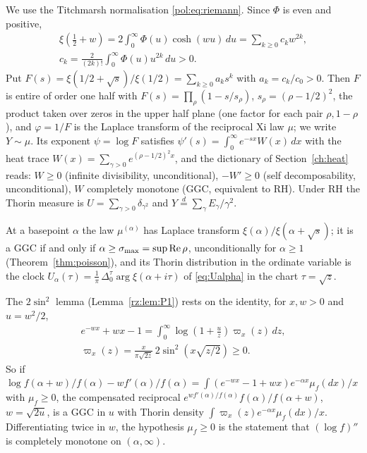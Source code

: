 We use the Titchmarsh normalisation \eqref{pol:eq:riemann}. Since $\Phi$ is even and positive,
\begin{equation}\label{pol:eq:F}
\begin{gathered}
\xi\!\left(\tfrac12+w\right)=2\int_0^\infty\Phi(u)\cosh(wu)\,du=\sum_{k\ge0}c_kw^{2k},\\[4pt] c_k=\frac{2}{(2k)!}\int_0^\infty\Phi(u)u^{2k}\,du>0 .
\end{gathered}
\end{equation}
Put $F(s)=\xi(1/2+\sqrt s)/\xi(1/2)=\sum_{k\ge0}a_ks^k$ with $a_k=c_k/c_0>0$. Then $F$ is entire of order one half with $F(s)=\prod_\rho(1-s/s_\rho)$, $s_\rho=(\rho-1/2)^2$, the product taken over zeros in the upper half plane (one factor for each pair $\rho,1-\rho$), and $\varphi=1/F$ is the Laplace transform of the reciprocal Xi law $\mu$; we write $Y\sim\mu$. Its exponent $\psi=\log F$ satisfies $\psi'(s)=\int_0^\infty e^{-sx}W(x)\,dx$ with the heat trace $W(x)=\sum_{\gamma>0}e^{(\rho-1/2)^2x}$, and the dictionary of Section~\ref{ch:heat} reads: $W\ge0$ (infinite divisibility, unconditional), $-W'\ge0$ (self decomposability, unconditional), $W$ completely monotone (GGC, equivalent to RH). Under RH the Thorin measure is $U=\sum_{\gamma>0}\delta_{\gamma^2}$ and $Y\stackrel{d}{=}\sum_\gamma E_\gamma/\gamma^2$.

At a basepoint $\alpha$ the law $\mu^{(\alpha)}$ has Laplace transform $\xi(\alpha)/\xi(\alpha+\sqrt s)$; it is a GGC if and only if $\alpha\ge\sigma_{\max}=\sup\operatorname{Re}\rho$, unconditionally for $\alpha\ge1$ (Theorem~\ref{thm:poisson}), and its Thorin distribution in the ordinate variable is the clock $U_\alpha(\tau)=\frac1\pi\,\Delta_0^\tau\arg\xi(\alpha+i\tau)$ of \eqref{eq:Ualpha} in the chart $\tau=\sqrt z$.

The $2\sin^2$ lemma (Lemma~\ref{rz:lem:P1}) rests on the identity, for $x,w>0$ and $u=w^2/2$,
\begin{equation}\label{pol:eq:lemma}
\begin{gathered}
e^{-wx}+wx-1=\int_0^\infty\log\!\left(1+\frac uz\right)\varpi_x(z)\,dz,\\[4pt] \varpi_x(z)=\frac{x}{\pi\sqrt{2z}}\,2\sin^2\!\left(x\sqrt{z/2}\right)\ge0 .
\end{gathered}
\end{equation}
So if $\log f(\alpha+w)/f(\alpha)-wf'(\alpha)/f(\alpha)=\int(e^{-wx}-1+wx)e^{-\alpha x}\mu_f(dx)/x$ with $\mu_f\ge0$, the compensated reciprocal $e^{wf'(\alpha)/f(\alpha)}f(\alpha)/f(\alpha+w)$, $w=\sqrt{2u}$, is a GGC in $u$ with Thorin density $\int\varpi_x(z)e^{-\alpha x}\mu_f(dx)/x$. Differentiating twice in $w$, the hypothesis $\mu_f\ge0$ is the statement that $(\log f)''$ is completely monotone on $(\alpha,\infty)$.

